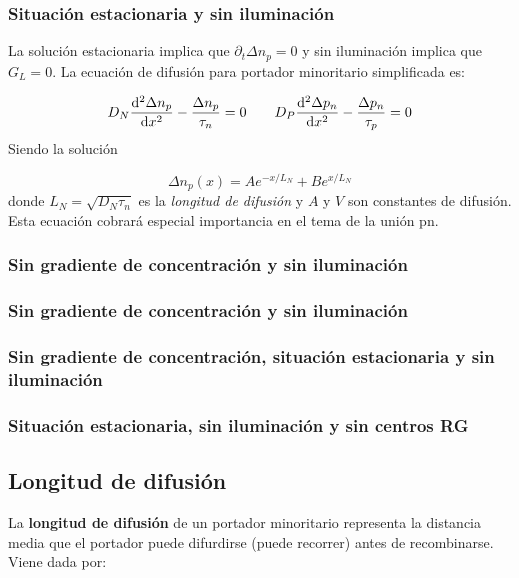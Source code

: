 \subsubsection{Situación estacionaria y sin iluminación} \label{Subsec:02-04-02}

La solución estacionaria implica que $\partial_t \Delta n_p=0$ y sin iluminación implica que $G_L=0$. La ecuación de difusión para portador minoritario simplificada es:

\begin{equation}
	D_N \frac{\mathrm{d} ^2 \Delta n_p}{\mathrm{d}  x^2} - \frac{\Delta n_p}{\tau_n} = 0 \qquad
	D_P \frac{\mathrm{d} ^2 \Delta p_n}{\mathrm{d}  x^2} - \frac{\Delta p_n}{\tau_p} = 0
\end{equation}
Siendo la solución

\begin{equation}
	\Delta n_p (x) = A e^{-x/L_N} + B e^{x/L_N}
\end{equation}
donde $L_N=\sqrt{D_N \tau_n}$ es la \textit{longitud de difusión} y $A$ y $V$ son constantes de difusión. Esta ecuación cobrará especial importancia en el tema de la unión pn.

\subsubsection{Sin gradiente de concentración y sin iluminación}
\subsubsection{Sin gradiente de concentración y sin iluminación}
\subsubsection{Sin gradiente de concentración, situación estacionaria y sin iluminación}

\subsubsection{Situación estacionaria, sin iluminación y sin centros RG}

\subsection{Longitud de difusión}

La \textbf{longitud de difusión} de un portador minoritario representa la distancia media que el portador puede difurdirse (puede recorrer) antes de recombinarse. Viene dada por:

